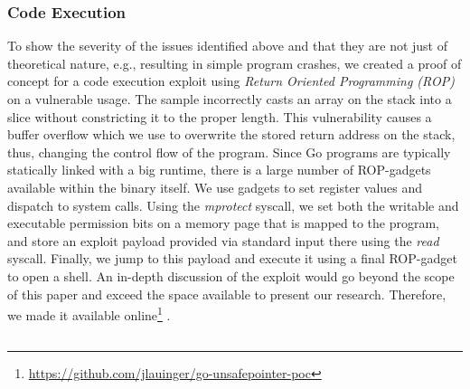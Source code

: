 \subsubsection*{Code Execution}

To show the severity of the issues identified above and that they are not just of theoretical nature, e.g., resulting in simple program crashes, we created a proof of concept for a code execution exploit using \textit{Return Oriented Programming (ROP)} on a vulnerable \unsafe{} usage. %
The sample incorrectly casts an array on the stack into a slice without constricting it to the proper length.
This vulnerability causes a buffer overflow which we use to overwrite the stored return address on the stack, thus, changing the control flow of the program. 
Since Go programs are typically statically linked with a big runtime, there is a large number of ROP-gadgets available within the binary itself. 
We use gadgets to set register values and dispatch to system calls. 
Using the \textit{mprotect} syscall, we set both the writable and executable permission bits on a memory page that is mapped to the program, and store an exploit payload provided via standard input there using the \textit{read} syscall. 
Finally, we jump to this payload and execute it using a final ROP-gadget to open a shell.
An in-depth discussion of the exploit would go beyond the scope of this paper and exceed the space available to present our research.
Therefore, we made it available online\footnote{\url{https://github.com/jlauinger/go-unsafepointer-poc}\label{fn:poc}} . 



\subsection{}

\label{sec:appr:toolSA}


